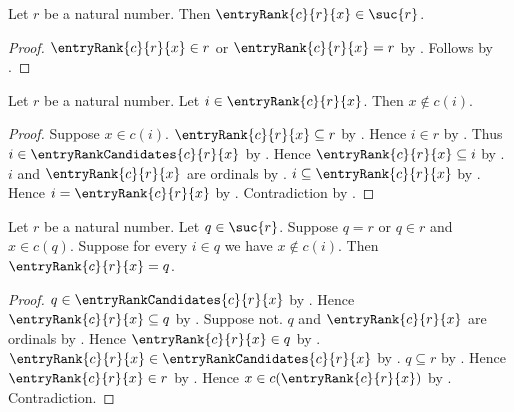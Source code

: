 \begin{proposition}\label{entry_rank_in_successor}
    Let $r$ be a natural number.
    Then $\entryRank{c}{r}{x}\in\suc{r}$.
\end{proposition}
\begin{proof}
    $\entryRank{c}{r}{x}\in r$ or
        $\entryRank{c}{r}{x}=r$
        by .
    Follows by .
\end{proof}

\begin{proposition}\label{entry_rank_no_earlier_entry}
    Let $r$ be a natural number.
    Let $i\in\entryRank{c}{r}{x}$.
    Then $x\notin c(i)$.
\end{proposition}
\begin{proof}
    Suppose $x\in c(i)$.
    $\entryRank{c}{r}{x}\subseteq r$
        by .
    Hence $i\in r$ by .
    Thus $i\in\entryRankCandidates{c}{r}{x}$
        by .
    Hence $\entryRank{c}{r}{x}\subseteq i$
        by .
    $i$ and $\entryRank{c}{r}{x}$ are ordinals
        by .
    $i\subseteq\entryRank{c}{r}{x}$
        by .
    Hence $i=\entryRank{c}{r}{x}$
        by .
    Contradiction by .
\end{proof}

\begin{proposition}\label{entry_rank_eq_from_first_candidate}
    Let $r$ be a natural number.
    Let $q\in\suc{r}$.
    Suppose $q=r$ or $q\in r$ and $x\in c(q)$.
    Suppose for every $i\in q$ we have $x\notin c(i)$.
    Then $\entryRank{c}{r}{x}=q$.
\end{proposition}
\begin{proof}
    $q\in\entryRankCandidates{c}{r}{x}$
        by .
    Hence $\entryRank{c}{r}{x}\subseteq q$
        by .
    Suppose not.
    $q$ and $\entryRank{c}{r}{x}$ are ordinals
        by .
    Hence $\entryRank{c}{r}{x}\in q$
        by .
    $\entryRank{c}{r}{x}\in\entryRankCandidates{c}{r}{x}$
        by .
    $q\subseteq r$ by
        .
    Hence $\entryRank{c}{r}{x}\in r$ by .
    Hence $x\in c(\entryRank{c}{r}{x})$
        by .
    Contradiction.
\end{proof}

